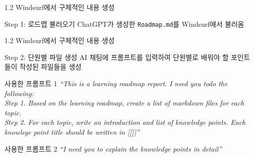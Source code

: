 \documentclass[aspectratio=169,xcolor=dvipsnames]{beamer}
\begin{document}
\begin{frame}{1.2 Windsurf에서 구체적인 내용 생성}
  \begin{block}{Step 1: 로드맵 불러오기}
    ChatGPT가 생성한 \texttt{Roadmap.md}를 Windsurf에서 불러옴
  \end{block}
  \begin{center}
  \end{center}
\end{frame}


\begin{frame}{1.2 Windsurf에서 구체적인 내용 생성}

  \begin{block}{Step 2: 단원별 파일 생성}
    AI 채팅에 프롬프트를 입력하여 단원별로 배워야 할 포인트들이 작성된 파일들을 생성
  \end{block}
  \begin{alertblock}{사용한 프롬프트 1}
    \textit{``This is a learning roadmap report. I need you todo the following: \\
Step 1. Based on the learning roadmap, create a list of markdown files for each topic.\\  
Step 2. For each topic, write an introduction and list of knowledge points. Each knowlege point title should be written in [[]]''}
  \end{alertblock}

  \begin{alertblock}{사용한 프롬프트 2}
    \textit{``I need you to explain the knowledge points in detail''}
  \end{alertblock}

\end{frame}
\end{document}
